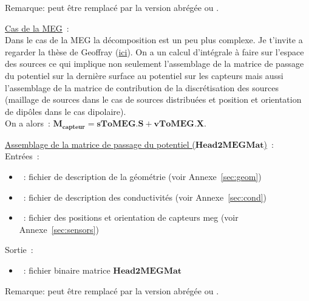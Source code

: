 \medskip

\noindent
{}
\medskip
Remarque:  peut être remplacé par la version abrégée  ou .

\bigskip

\checkItem \underline{Cas de la MEG}~:\\
Dans le cas de la MEG la décomposition est un peu plus complexe. Je t'invite a regarder la thèse de Geoffray
(\href{http://pastel.paristech.org/1593/}{ici}). On a un calcul d'intégrale à faire sur l'espace des sources ce qui implique non
seulement l'assemblage de la matrice de passage du potentiel sur la dernière surface au potentiel sur les capteurs mais aussi
l'assemblage de la matrice de contribution de la discrétisation des sources (maillage de sources dans le cas de sources
distribuées et position et orientation de dipôles dans le cas dipolaire).\\
On a alors~: $\mathbf{M_{capteur}} = \mathbf{sToMEG} . \mathbf{S} + \mathbf{vToMEG}.\mathbf{X}$.

\medskip

\noindent
\underline{Assemblage de la matrice de passage du potentiel ($\mathbf{Head2MEGMat}$)}~:\\
Entrées~:
\begin{itemize}
    \item {}~: fichier de description de la géométrie (voir Annexe~\ref{sec:geom})
    \item {}~: fichier de description des conductivités (voir Annexe~\ref{sec:cond})
    \item {}~: fichier des positions et orientation de capteurs meg (voir Annexe~\ref{sec:sensors})
\end{itemize}
Sortie~:
\begin{itemize}
    \item {}~: fichier binaire matrice $\mathbf{Head2MEGMat}$
\end{itemize}

\medskip

\noindent
{}
\medskip
Remarque:  peut être remplacé par la version abrégée  ou .

